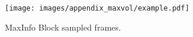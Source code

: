 \begin{figure}[ht]
\vskip 0.2in
\begin{center}
\centerline{\texttt{[image: images/appendix\_maxvol/example.pdf]}}
\caption{MaxInfo Block sampled frames.}
\label{maxvol-visualisation}
\end{center}
\vskip -0.2in
\end{figure}